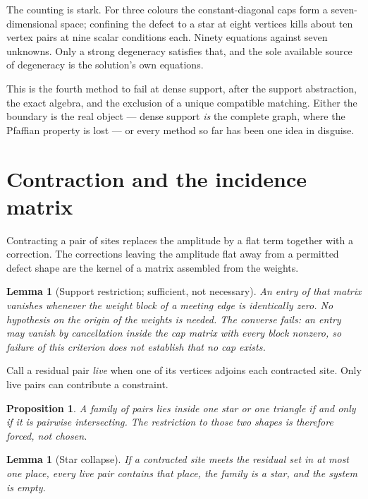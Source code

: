 \documentclass[11pt]{article}
\newtheorem{lemma}[theorem]{Lemma}
\newtheorem{proposition}[theorem]{Proposition}
\theoremstyle{definition}
\theoremstyle{remark}
\begin{document}
The counting is stark. For three colours the constant-diagonal caps form a
seven-dimensional space; confining the defect to a star at eight vertices kills
about ten vertex pairs at nine scalar conditions each. Ninety equations against
seven unknowns. Only a strong degeneracy satisfies that, and the sole available
source of degeneracy is the solution's own equations.

This is the fourth method to fail at dense support, after the support abstraction,
the exact algebra, and the exclusion of a unique compatible matching. Either the
boundary is the real object --- dense support \emph{is} the complete graph, where the
Pfaffian property is lost --- or every method so far has been one idea in disguise.

\section{Contraction and the incidence matrix}\label{sec:contract}

Contracting a pair of sites replaces the amplitude by a flat term together with a
correction. The corrections leaving the amplitude flat away from a permitted defect
shape are the kernel of a matrix assembled from the weights.

\begin{lemma}[Support restriction; sufficient, not necessary]
An entry of that matrix vanishes whenever the weight block of a meeting edge is
identically zero. No hypothesis on the origin of the weights is needed. The converse
fails: an entry may vanish by cancellation inside the cap matrix with every block
nonzero, so failure of this criterion does not establish that no cap exists.
\end{lemma}

Call a residual pair \emph{live} when one of its vertices adjoins each contracted
site. Only live pairs can contribute a constraint.

\begin{proposition}
A family of pairs lies inside one star or one triangle if and only if it is pairwise
intersecting. The restriction to those two shapes is therefore forced, not chosen.
\end{proposition}

\begin{lemma}[Star collapse]
If a contracted site meets the residual set in at most one place, every live pair
contains that place, the family is a star, and the system is empty.
\end{lemma}
\end{document}
